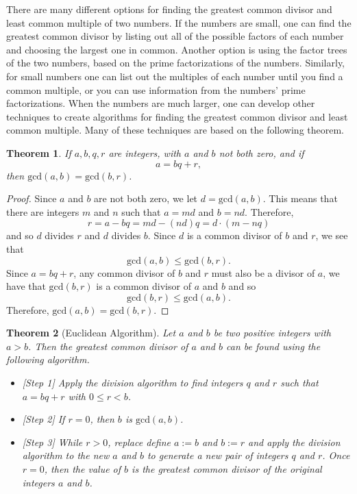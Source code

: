 \documentclass[
]{book}
\providecommand{\tightlist}{%
  \setlength{\itemsep}{0pt}\setlength{\parskip}{0pt}}
\newtheorem{theorem}{Theorem}[chapter]
\theoremstyle{definition}
\theoremstyle{definition}
\theoremstyle{definition}
\theoremstyle{definition}
\theoremstyle{remark}
\begin{document}
There are many different options for finding the greatest common divisor and least common multiple of two numbers. If the numbers are small, one can find the greatest common divisor by listing out all of the possible factors of each number and choosing the largest one in common. Another option is using the factor trees of the two numbers, based on the prime factorizations of the numbers. Similarly, for small numbers one can list out the multiples of each number until you find a common multiple, or you can use information from the numbers' prime factorizations. When the numbers are much larger, one can develop other techniques to create algorithms for finding the greatest common divisor and least common multiple. Many of these techniques are based on the following theorem.

\begin{theorem}
\protect\hypertarget{thm:integers-division-gcd}{}\label{thm:integers-division-gcd}If \(a,b,q,r\) are integers, with \(a\) and \(b\) not both zero, and if \[a=bq+r,\] then \(\mathrm{gcd}(a,b)=\mathrm{gcd}(b,r)\).
\end{theorem}

\begin{proof}
Since \(a\) and \(b\) are not both zero, we let \(d=\mathrm{gcd}(a,b)\). This means that there are integers \(m\) and \(n\) such that \(a=md\) and \(b=nd\). Therefore,
\[r=a-bq=md-(nd)q = d\cdot (m-nq)\] and so \(d\) divides \(r\) and \(d\) divides \(b\). Since \(d\) is a common divisor of \(b\) and \(r\), we see that \[\mathrm{gcd}(a,b)\leq \mathrm{gcd}(b,r).\] Since \(a=bq+r\), any common divisor of \(b\) and \(r\) must also be a divisor of \(a\), we have that \(\mathrm{gcd}(b,r)\) is a common divisor of \(a\) and \(b\) and so \[\mathrm{gcd}(b,r) \leq \mathrm{gcd}(a,b).\] Therefore, \(\mathrm{gcd}(a,b)=\mathrm{gcd}(b,r)\).
\end{proof}

\begin{theorem}[Euclidean Algorithm]

Let \(a\) and \(b\) be two positive integers with \(a>b\). Then the greatest common divisor of \(a\) and \(b\) can be found using the following algorithm.

\begin{itemize}
\tightlist
\item
  {[}Step 1{]} Apply the division algorithm to find integers \(q\) and \(r\) such that \(a=bq+r\) with \(0\leq r<b\).
\item
  {[}Step 2{]} If \(r=0\), then \(b\) is \(\mathrm{gcd}(a,b)\).
\item
  {[}Step 3{]} While \(r>0\), replace define \(a:=b\) and \(b:=r\) and apply the division algorithm to the new \(a\) and \(b\) to generate a new pair of integers \(q\) and \(r\). Once \(r=0\), then the value of \(b\) is the greatest common divisor of the original integers \(a\) and \(b\).
\end{itemize}

\end{theorem}
\end{document}
